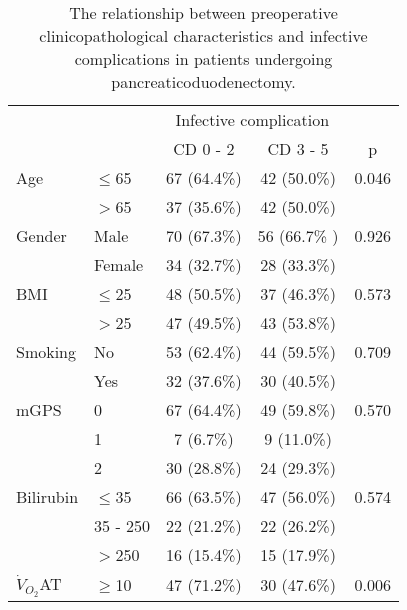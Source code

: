 \begin{table}[p]
	\centering
	\caption{The relationship between preoperative clinicopathological characteristics and infective complications in patients undergoing pancreaticoduodenectomy.}
	\label{table:crp_comp_preop_factors}
	\renewcommand{\arraystretch}{1.2} %
	\setlength{\tabcolsep}{12pt} %
	\begin{tabular}{|l l | c c |c|}
		\hline
		                  &          & \multicolumn{2}{c|}{Infective complication} &  \\
		                  &          & CD 0 - 2    & CD 3 - 5                       & p     \\ \hline
		Age               & $\leq$65 & 67 (64.4\%) & 42 (50.0\%)                    & 0.046 \\
		                  & $>$65    & 37 (35.6\%) & 42 (50.0\%)                    &  \\
		Gender            & Male     & 70 (67.3\%) & 56 (66.7\% )                   & 0.926 \\
		                  & Female   & 34 (32.7\%) & 28 (33.3\%)                    &  \\
		BMI               & $\leq$25 & 48 (50.5\%) & 37 (46.3\%)                    & 0.573 \\
		                  & $>$25    & 47 (49.5\%) & 43 (53.8\%)                    &  \\
		Smoking           & No       & 53 (62.4\%) & 44 (59.5\%)                    & 0.709 \\
		                  & Yes      & 32 (37.6\%) & 30 (40.5\%)                    &  \\
		mGPS              & 0        & 67 (64.4\%) & 49 (59.8\%)                    & 0.570 \\
		                  & 1        & 7 (6.7\%)   & 9 (11.0\%)                     &  \\
		                  & 2        & 30 (28.8\%) & 24 (29.3\%)                    &  \\
		Bilirubin         & $\leq$35 & 66 (63.5\%) & 47 (56.0\%)                    & 0.574 \\
		                  & 35 - 250 & 22 (21.2\%) & 22 (26.2\%)                    &  \\
		                  & $>$250   & 16 (15.4\%) & 15 (17.9\%)                    &  \\
		$\dot{V}_{O_2}$AT & $\geq$10 & 47 (71.2\%) & 30 (47.6\%)                    & 0.006 \\

\end{tabular}
\end{table}

